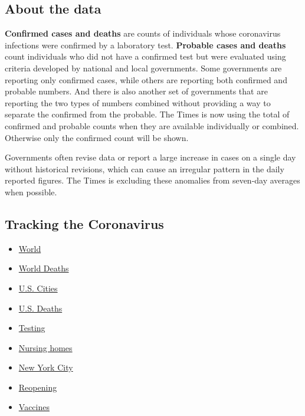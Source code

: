 \hypertarget{about-the-data}{%
\subsection{About the data}\label{about-the-data}}

\textbf{Confirmed cases and deaths} are counts of individuals whose
coronavirus infections were confirmed by a laboratory test.
\textbf{Probable cases and deaths} count individuals who did not have a
confirmed test but were evaluated using criteria developed by national
and local governments. Some governments are reporting only confirmed
cases, while others are reporting both confirmed and probable numbers.
And there is also another set of governments that are reporting the two
types of numbers combined without providing a way to separate the
confirmed from the probable. The Times is now using the total of
confirmed and probable counts when they are available individually or
combined. Otherwise only the confirmed count will be shown.

Governments often revise data or report a large increase in cases on a
single day without historical revisions, which can cause an irregular
pattern in the daily reported figures. The Times is excluding these
anomalies from seven-day averages when possible.

\hypertarget{tracking-the-coronavirus}{%
\subsection{Tracking the Coronavirus}\label{tracking-the-coronavirus}}

\begin{itemize}
\tightlist
\item
  \href{https://www.nytimes3xbfgragh.onion/interactive/2020/world/coronavirus-maps.html}{World}
\item
  \href{https://www.nytimes3xbfgragh.onion/interactive/2020/04/21/world/coronavirus-missing-deaths.html}{World
  Deaths}
\item
  \href{https://www.nytimes3xbfgragh.onion/interactive/2020/04/23/upshot/five-ways-to-monitor-coronavirus-outbreak-us.html}{U.S.
  Cities}
\item
  \href{https://www.nytimes3xbfgragh.onion/interactive/2020/05/05/us/coronavirus-death-toll-us.html}{U.S.
  Deaths}
\item
  \href{https://www.nytimes3xbfgragh.onion/interactive/2020/us/coronavirus-testing.html}{Testing}
\item
  \href{https://www.nytimes3xbfgragh.onion/interactive/2020/us/coronavirus-nursing-homes.html}{Nursing
  homes}
\item
  \href{https://www.nytimes3xbfgragh.onion/interactive/2020/nyregion/new-york-city-coronavirus-cases.html}{New
  York City}
\item
  \href{https://www.nytimes3xbfgragh.onion/interactive/2020/us/states-reopen-map-coronavirus.html}{Reopening}
\item
  \href{https://www.nytimes3xbfgragh.onion/interactive/2020/science/coronavirus-vaccine-tracker.html}{Vaccines}
\end{itemize}

